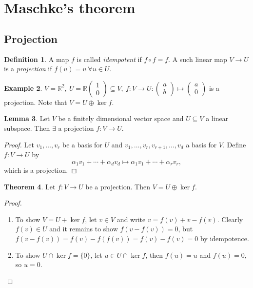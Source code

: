 \documentclass[a4paper]{article}
\newcommand{\R}{\mathbb{R}}
\theoremstyle{definition}
\newtheorem{defn}{Definition}[subsection]
\newtheorem{thm}[defn]{Theorem}
\newtheorem{lemma}[defn]{Lemma}
\newtheorem{example}[defn]{Example}
\begin{document}
\section{Maschke's theorem}
\subsection{Projection}
\begin{defn}
A map $f$ is called \textit{idempotent} if $f\circ f=f$. A such linear map $V\rightarrow U$ is a \textit{projection} if $f(u)=u \ \forall u\in U$.
\end{defn}
\begin{example}
$V=\R^2,\ U=\R\begin{pmatrix}1\\0\end{pmatrix}\subseteq V,\ f:V\rightarrow U:\begin{pmatrix}a\\b\end{pmatrix}\mapsto\begin{pmatrix}a\\0\end{pmatrix}$ is a projection. Note that $V=U\oplus\ker f$.
\end{example}

\begin{lemma}
Let $V$ be a finitely dimensional vector space and $U\subseteq V$ a linear subspace. Then $\exists $ a projection $f:V\rightarrow U$.
\end{lemma}
\begin{proof}
Let $v_1,\ldots,v_r$ be a basis for $U$ and $v_1,\ldots,v_r,v_{r+1},\ldots,v_d$ a basis for $V$. Define $f:V\rightarrow U$ by
\[
\alpha_1 v_1+\cdots+\alpha_d v_d \mapsto \alpha_1 v_1+\cdots+\alpha_r v_r,
\]
which is a projection.
\end{proof}

\begin{thm}
\label{thm:fprojimpVisUopkerf}
Let $f:V\rightarrow U$ be a projection. Then $V=U\oplus\ker f$.
\end{thm}
\begin{proof}
\begin{enumerate}
\item To show $V=U+\ker f$, let $v\in V$ and write $v=f(v)+v-f(v)$. Clearly $f(v)\in U$ and it remains to show $f(v-f(v))=0$, but $f(v-f(v))=f(v)-f(f(v))=f(v)-f(v)=0$ by idempotence.
\item To show $U\cap\ker f=\{0\}$, let $u\in U\cap\ker f$, then $f(u)=u$ and $f(u)=0$, so $u=0$.
\end{enumerate}
\end{proof}
\end{document}
